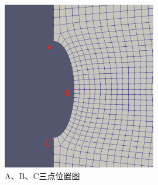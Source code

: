 \begin{figure}[ht!]
    \centering
    \includegraphics[width=0.6\textwidth]{img/chap5/应力/位置图.png}
    \caption{A、B、C三点位置图}
    \label{fig:5_34}
\end{figure}

